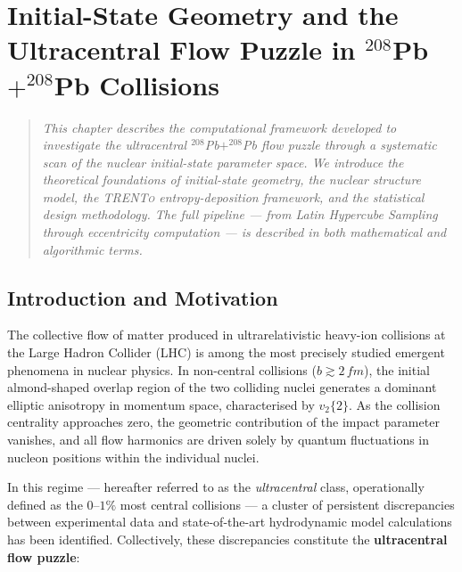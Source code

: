 \documentclass[12pt,a4paper,twoside]{report}
\newcommand{\trento}{\textsc{TRENTo}\xspace}
\newcommand{\vn}[2]{v_{#1}\{#2\}}
\newcommand{\PbPb}{$^{208}$Pb$+^{208}$Pb\xspace}
\begin{document}
\setcounter{chapter}{3}

\chapter{Initial-State Geometry and the Ultracentral Flow Puzzle in
         \texorpdfstring{\PbPb}{208Pb+208Pb} Collisions}
\label{ch:ultracentral}

\begin{quote}
\itshape
This chapter describes the computational framework developed to investigate
the ultracentral \PbPb flow puzzle through a systematic scan of the nuclear
initial-state parameter space.  We introduce the theoretical foundations of
initial-state geometry, the nuclear structure model, the \trento
entropy-deposition framework, and the statistical design methodology.
The full pipeline — from Latin Hypercube Sampling through eccentricity
computation — is described in both mathematical and algorithmic terms.
\end{quote}

\section{Introduction and Motivation}
\label{sec:intro_puzzle}

The collective flow of matter produced in ultrarelativistic heavy-ion
collisions at the Large Hadron Collider (LHC) is among the most precisely
studied emergent phenomena in nuclear physics.  In non-central collisions
($b \gtrsim 2\,\si{fm}$), the initial almond-shaped overlap region of the
two colliding nuclei generates a dominant elliptic anisotropy in momentum
space, characterised by $\vn{2}{2}$.  As the collision centrality approaches
zero, the geometric contribution of the impact parameter vanishes, and all
flow harmonics are driven solely by quantum fluctuations in nucleon positions
within the individual nuclei.

In this regime — hereafter referred to as the \emph{ultracentral} class,
operationally defined as the \mbox{$0$--$1\%$} most central collisions — a
cluster of persistent discrepancies between experimental data and state-of-the-art
hydrodynamic model calculations has been identified.  Collectively, these
discrepancies constitute the \textbf{ultracentral flow puzzle}:
\end{document}

